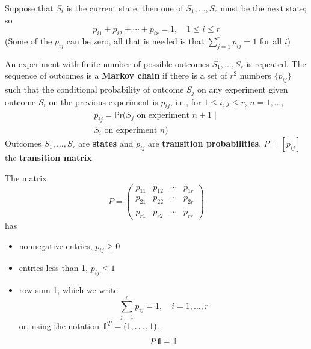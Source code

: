 \documentclass[aspectratio=43]{beamer}
\begin{document}
\begin{frame} 
Suppose that $S_i$ is the current state, then one of $S_1, \ldots,S_r$ must be the next state; so
\[
p_{i1}+p_{i2}+\cdots+p_{ir}=1, \quad 1\leq i\leq r
\]
(Some of the $p_{ij}$ can be zero, all that is needed is that $\sum_{j=1}^r p_{ij}=1$ for all $i$)
\vfill
\begin{definition}
An experiment with finite number of possible outcomes $S_1,\ldots,S_r$ is repeated. The sequence of outcomes is a \textbf{Markov chain} if there is a set of $r^2$ numbers $\{p_{ij}\}$ such that the conditional probability of outcome $S_j$ on any experiment given outcome $S_i$ on the previous experiment is $p_{ij}$, i.e., for $1\leq i,j\leq r$, $n=1,\ldots$,
\begin{multline*}
	p_{ij}=\mathsf{Pr}(S_j\textrm{ on experiment }n+1\;|\; \\
	S_i\textrm{ on experiment }n)	
\end{multline*}
Outcomes $S_1,\ldots,S_r$ are \textbf{states} and $p_{ij}$ are \textbf{transition probabilities}. $P=[p_{ij}]$ the \textbf{transition matrix}
\end{definition}
\end{frame}


\begin{frame} 
The matrix 
\[
P=
\begin{pmatrix}
p_{11} & p_{12} & \cdots & p_{1r} \\
p_{21} & p_{22} & \cdots & p_{2r} \\
&&& \\
p_{r1} & p_{r2} & \cdots & p_{rr}
\end{pmatrix}
\]
has
\begin{itemize}
\item nonnegative entries, $p_{ij}\geq 0$
\item entries less than 1, $p_{ij}\leq 1$
\item row sum 1, which we write
\[
\sum_{j=1}^r p_{ij}=1,\quad i=1,\ldots,r
\]
or, using the notation $\nbOne^T=(1,\ldots,1)$,
\[
P\nbOne=\nbOne
\]
\end{itemize}
\end{frame}


\end{document}
